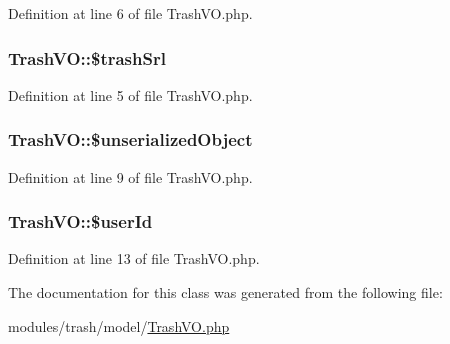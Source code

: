 Definition at line 6 of file Trash\+V\+O.\+php.

\subsubsection[{\texorpdfstring{\$trash\+Srl}{$trashSrl}}]{\setlength{\rightskip}{0pt plus 5cm}Trash\+V\+O\+::\$trash\+Srl}\hypertarget{classTrashVO_a8aeea2d547b7a335d987bcf4369a969c}{}\label{classTrashVO_a8aeea2d547b7a335d987bcf4369a969c}


Definition at line 5 of file Trash\+V\+O.\+php.

\subsubsection[{\texorpdfstring{\$unserialized\+Object}{$unserializedObject}}]{\setlength{\rightskip}{0pt plus 5cm}Trash\+V\+O\+::\$unserialized\+Object}\hypertarget{classTrashVO_a43048c60bc9505999742be271b5d9385}{}\label{classTrashVO_a43048c60bc9505999742be271b5d9385}


Definition at line 9 of file Trash\+V\+O.\+php.

\subsubsection[{\texorpdfstring{\$user\+Id}{$userId}}]{\setlength{\rightskip}{0pt plus 5cm}Trash\+V\+O\+::\$user\+Id}\hypertarget{classTrashVO_a346f371317bde03b5a209e00cb33a603}{}\label{classTrashVO_a346f371317bde03b5a209e00cb33a603}


Definition at line 13 of file Trash\+V\+O.\+php.



The documentation for this class was generated from the following file\+:\begin{DoxyCompactItemize}
\item 
modules/trash/model/\hyperlink{TrashVO_8php}{Trash\+V\+O.\+php}\end{DoxyCompactItemize}
